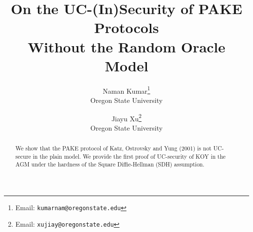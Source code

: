 \documentclass[11pt,letterpaper]{article}
\title{\LARGE{\textbf{On the UC-(In)Security of PAKE Protocols \\ Without the Random Oracle Model}}}
\author{{Naman Kumar}\footnote{Email: \texttt{kumarnam@oregonstate.edu}} \\Oregon State University\\ \and {Jiayu Xu}\footnote{Email: \texttt{xujiay@oregonstate.edu}}\\ Oregon State University}
\begin{document}
	\maketitle
	
	\begin{abstract}
		We show that the PAKE protocol of Katz, Ostrovsky and Yung (2001) is not UC-secure in the plain model. We provide the first proof of UC-security of KOY in the AGM under the hardness of the Square Diffie-Hellman (SDH) assumption.
	\end{abstract}

	\newpage
	\tableofcontents
	\newpage
	
	
	
	
	
	
	
	\newpage
	
	
	
	\newpage
	\appendix
	
	
	
	
\end{document}
